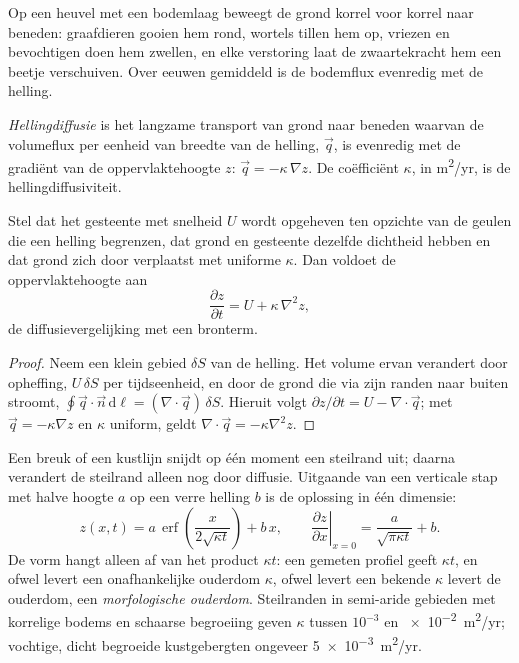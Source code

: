 Op een heuvel met een bodemlaag beweegt de grond korrel voor korrel naar beneden: graafdieren
gooien hem rond, wortels tillen hem op, vriezen en bevochtigen doen hem zwellen, en elke
verstoring laat de zwaartekracht hem een beetje verschuiven. Over eeuwen gemiddeld is de
bodemflux evenredig met de helling.

\begin{definition}[Hellingdiffusie]\label{def:b3:quantitative-geomorphology:diffusion}
\emph{Hellingdiffusie} is het langzame
transport van grond naar beneden waarvan de volumeflux per eenheid van breedte van de helling,
$\vec q$, is evenredig met de gradiënt van de oppervlaktehoogte $z$:
$\vec q = -\kappa\,\nabla z$. De coëfficiënt $\kappa$, in
\unit{m^2/yr}, is de hellingdiffusiviteit.
\end{definition}

\begin{theorem}\label{thm:b3:quantitative-geomorphology:diffusion}
Stel dat het gesteente met snelheid $U$ wordt opgeheven ten opzichte van de geulen die een
helling begrenzen, dat grond en gesteente dezelfde dichtheid hebben en dat grond zich door 
verplaatst met uniforme $\kappa$. Dan voldoet de oppervlaktehoogte aan
\[
\frac{\partial z}{\partial t} = U + \kappa\,\nabla^2 z ,
\]
de diffusievergelijking met een bronterm.
\end{theorem}

\begin{proof}
Neem een klein gebied $\delta S$ van de helling. Het volume ervan verandert door opheffing,
$U\,\delta S$ per tijdseenheid, en door de grond die via zijn
randen naar buiten stroomt, $\oint \vec q\cdot\vec n\,\mathrm{d}\ell = (\nabla\cdot\vec q)\,\delta S$.
Hieruit volgt $\partial z/\partial t = U - \nabla\cdot\vec q$; met $\vec q = -\kappa
\nabla z$ en $\kappa$ uniform, geldt $\nabla\cdot\vec q = -\kappa\nabla^2 z$.
\end{proof}

Een breuk of een kustlijn snijdt op één moment een steilrand uit; daarna
verandert de steilrand alleen nog door diffusie. Uitgaande van een verticale stap met halve hoogte $a$ op een verre
helling $b$ is de oplossing in één dimensie:
\[
z(x,t) = a\,\operatorname{erf}\!\left(\frac{x}{2\sqrt{\kappa t}}\right) + b\,x ,
\qquad
\left.\frac{\partial z}{\partial x}\right|_{x=0} = \frac{a}{\sqrt{\pi\kappa t}} + b .
\]
De vorm hangt alleen af van het product $\kappa t$: een gemeten profiel geeft
$\kappa t$, en ofwel levert een onafhankelijke ouderdom $\kappa$, ofwel levert een bekende
$\kappa$ levert de ouderdom, een \emph{morfologische ouderdom}. Steilranden in semi-aride
gebieden met korrelige bodems en schaarse begroeiing geven $\kappa$ tussen
$10^{-3}$ en \qty{e-2}{m^2/yr}; vochtige, dicht begroeide kustgebergten
ongeveer \qty{5e-3}{m^2/yr}.

